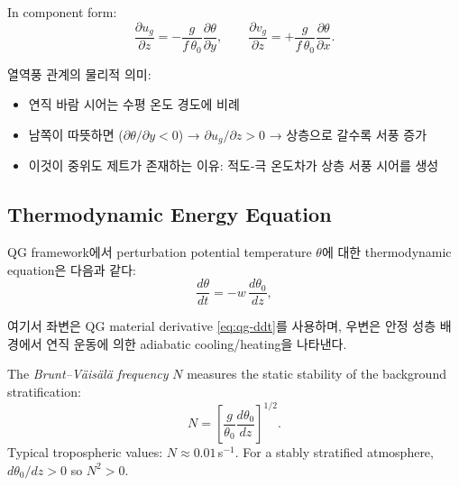 \noindent
In component form:
\begin{equation}\label{eq:thermal-wind-comp}
  \frac{\partial u_g}{\partial z}
  = -\frac{g}{f\,\theta_0}\frac{\partial\theta}{\partial y},
  \qquad
  \frac{\partial v_g}{\partial z}
  = +\frac{g}{f\,\theta_0}\frac{\partial\theta}{\partial x}.
\end{equation}

\begin{hisublock}
열역풍 관계의 물리적 의미:
\begin{itemize}
  \item 연직 바람 시어는 수평 온도 경도에 비례
  \item 남쪽이 따뜻하면 ($\partial\theta/\partial y < 0$) → $\partial u_g/\partial z > 0$ → 상층으로 갈수록 서풍 증가
  \item 이것이 중위도 제트가 존재하는 이유: 적도-극 온도차가 상층 서풍 시어를 생성
\end{itemize}
\end{hisublock}

\subsection{Thermodynamic Energy Equation}\label{subsec:thermo-z}

QG framework에서 perturbation potential temperature $\theta$에 대한 thermodynamic equation은
다음과 같다:
\begin{equation}\label{eq:thermo-qg-z}
  \frac{d\theta}{dt} = -w\,\frac{d\theta_0}{dz},
\end{equation}

\noindent
여기서 좌변은 QG material derivative \eqref{eq:qg-ddt}를 사용하며,
우변은 안정 성층 배경에서 연직 운동에 의한 adiabatic cooling/heating을 나타낸다.

\begin{definition}
The \emph{Brunt--V\"{a}is\"{a}l\"{a} frequency} $N$ measures the static stability
of the background stratification:
\begin{equation}\label{eq:BV-freq}
  N = \left[\frac{g}{\theta_0}\frac{d\theta_0}{dz}\right]^{1/2}.
\end{equation}
Typical tropospheric values: $N \approx 0.01$\,s$^{-1}$.
For a stably stratified atmosphere, $d\theta_0/dz > 0$ so $N^2 > 0$.
\end{definition}

